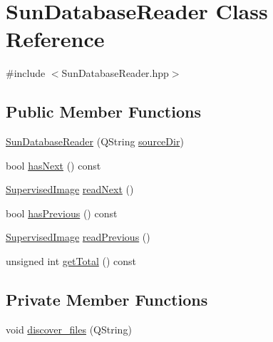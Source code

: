 \hypertarget{class_sun_database_reader}{\section{Sun\+Database\+Reader Class Reference}
\label{class_sun_database_reader}
}


{\ttfamily \#include $<$Sun\+Database\+Reader.\+hpp$>$}

\subsection*{Public Member Functions}
\begin{DoxyCompactItemize}
\item 
\hyperlink{class_sun_database_reader_a7165e085898b5e329402b8acc17f3e0e}{Sun\+Database\+Reader} (Q\+String \hyperlink{class_sun_database_reader_a6bfc31b2ba24be2b3e18c32e0d343d70}{source\+Dir})
\item 
bool \hyperlink{class_sun_database_reader_a5530b88632379c373b592d5128c2999f}{has\+Next} () const 
\item 
\hyperlink{class_supervised_image}{Supervised\+Image} \hyperlink{class_sun_database_reader_a92a92483d9b4eadc4008f29a89068e71}{read\+Next} ()
\item 
bool \hyperlink{class_sun_database_reader_abe3da501f9df416baf1b077e4d4eadb8}{has\+Previous} () const 
\item 
\hyperlink{class_supervised_image}{Supervised\+Image} \hyperlink{class_sun_database_reader_a8109235f5d4a3e7763afe22f4c8c37a0}{read\+Previous} ()
\item 
unsigned int \hyperlink{class_sun_database_reader_a8d704a7121e1babebe4673049d37a095}{get\+Total} () const 
\end{DoxyCompactItemize}
\subsection*{Private Member Functions}
\begin{DoxyCompactItemize}
\item 
void \hyperlink{class_sun_database_reader_aefbdf63eaff6755bb3dee0ef8687b3aa}{discover\+\_\+files} (Q\+String)
\end{DoxyCompactItemize}
